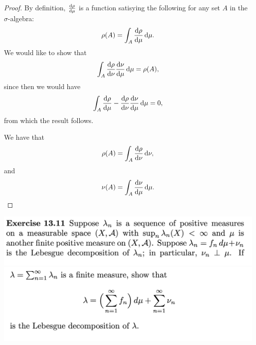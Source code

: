 \begin{proof}
  By definition, $\frac{\d\rho}{\d\mu}$ is a function satisying the following for any set $A$ in
  the $\sigma$-algebra:
  \begin{align*}
    \rho(A) = \int_A \frac{\d\rho}{\d\mu} \d\mu.
  \end{align*}
  We would like to show that
  \begin{align*}
    \int_A \frac{\d\rho}{\d\nu}\frac{\d\nu}{\d\mu} \d\mu = \rho(A),
  \end{align*}
  since then we would have
  \begin{align*}
    \int_A \frac{\d\rho}{\d\mu}  - \frac{\d\rho}{\d\nu}\frac{\d\nu}{\d\mu} \d\mu = 0,
  \end{align*}
  from which the result follows.

  We have that
  \begin{align*}
    \rho(A) = \int_A \frac{\d\rho}{\d\nu} \d\nu,
  \end{align*}
  and
  \begin{align*}
    \nu(A) = \int_A \frac{\d\nu}{\d\mu} \d\mu.
  \end{align*}
\end{proof}

\begin{mdframed}
\includegraphics[width=400pt]{img/analysis--berkeley-202a-hw11-c5a4.png}
\includegraphics[width=400pt]{img/analysis--berkeley-202a-hw11-3974.png}
\end{mdframed}